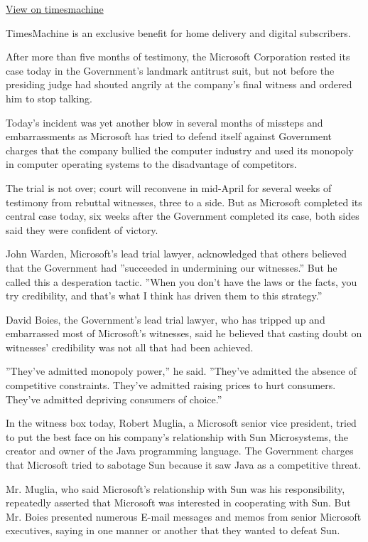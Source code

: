 \href{http://timesmachine.nytimes3xbfgragh.onion/timesmachine/1999/02/27/528269.html}{View
on timesmachine}

TimesMachine is an exclusive benefit for home delivery and digital
subscribers.

After more than five months of testimony, the Microsoft Corporation
rested its case today in the Government's landmark antitrust suit, but
not before the presiding judge had shouted angrily at the company's
final witness and ordered him to stop talking.

Today's incident was yet another blow in several months of missteps and
embarrassments as Microsoft has tried to defend itself against
Government charges that the company bullied the computer industry and
used its monopoly in computer operating systems to the disadvantage of
competitors.

The trial is not over; court will reconvene in mid-April for several
weeks of testimony from rebuttal witnesses, three to a side. But as
Microsoft completed its central case today, six weeks after the
Government completed its case, both sides said they were confident of
victory.

John Warden, Microsoft's lead trial lawyer, acknowledged that others
believed that the Government had ''succeeded in undermining our
witnesses.'' But he called this a desperation tactic. ''When you don't
have the laws or the facts, you try credibility, and that's what I think
has driven them to this strategy.''

David Boies, the Government's lead trial lawyer, who has tripped up and
embarrassed most of Microsoft's witnesses, said he believed that casting
doubt on witnesses' credibility was not all that had been achieved.

''They've admitted monopoly power,'' he said. ''They've admitted the
absence of competitive constraints. They've admitted raising prices to
hurt consumers. They've admitted depriving consumers of choice.''

In the witness box today, Robert Muglia, a Microsoft senior vice
president, tried to put the best face on his company's relationship with
Sun Microsystems, the creator and owner of the Java programming
language. The Government charges that Microsoft tried to sabotage Sun
because it saw Java as a competitive threat.

Mr. Muglia, who said Microsoft's relationship with Sun was his
responsibility, repeatedly asserted that Microsoft was interested in
cooperating with Sun. But Mr. Boies presented numerous E-mail messages
and memos from senior Microsoft executives, saying in one manner or
another that they wanted to defeat Sun.


